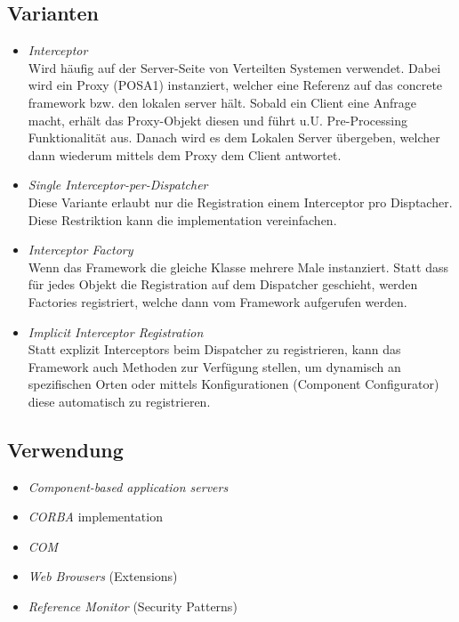 \subsection*{Varianten}
\begin{itemize}
	\item \emph{Interceptor}\\
	Wird häufig auf der Server-Seite von Verteilten Systemen verwendet. Dabei wird ein Proxy (POSA1) instanziert, welcher eine Referenz auf das concrete framework bzw. den lokalen server hält. Sobald ein Client eine Anfrage macht, erhält das Proxy-Objekt diesen und führt u.U. Pre-Processing Funktionalität aus. Danach wird es dem Lokalen Server übergeben, welcher dann wiederum mittels dem Proxy dem Client antwortet.
	\item \emph{Single Interceptor-per-Dispatcher}\\
	Diese Variante erlaubt nur die Registration einem Interceptor pro Disptacher. Diese Restriktion kann die implementation vereinfachen.
	\item \emph{Interceptor Factory}\\
	Wenn das Framework die gleiche Klasse mehrere Male instanziert. Statt dass für jedes Objekt die Registration auf dem Dispatcher geschieht, werden Factories registriert, welche dann vom Framework aufgerufen werden.
	\item \emph{Implicit Interceptor Registration}\\
	Statt explizit Interceptors beim Dispatcher zu registrieren, kann das Framework auch Methoden zur Verfügung stellen, um dynamisch an spezifischen Orten oder mittels Konfigurationen (Component Configurator) diese automatisch zu registrieren.
\end{itemize}


\subsection*{Verwendung}

\begin{itemize}
	\item \emph{Component-based application servers}
	\item \emph{CORBA} implementation
	\item \emph{COM}
	\item \emph{Web Browsers} (Extensions)
	\item \emph{Reference Monitor} (Security Patterns)
\end{itemize}


